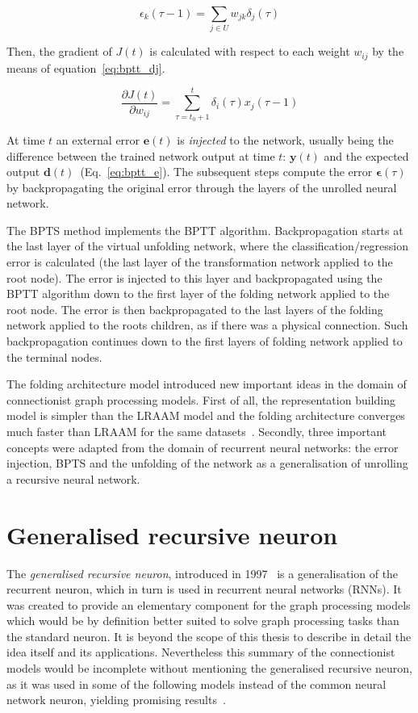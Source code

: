 \begin{equation}
\epsilon_k(\tau - 1) = \sum_{j \in U} w_{jk} \delta_j(\tau)
\label{eq:bptt_summaric}
\end{equation}

\noindent Then, the gradient of $J(t)$ is calculated with respect to each weight $w_{ij}$ by the means of equation~\ref{eq:bptt_dj}.

\begin{equation}
\frac{\partial J(t)}{\partial w_{ij}} = \sum_{\tau = t_0 + 1}^{t} \delta_i(\tau) x_j(\tau - 1)
\label{eq:bptt_dj}
\end{equation}

\noindent At time $t$ an external error $\bm{e}(t)$ is \emph{injected} to the network, usually being the difference between the trained network output at time $t$: $\bm{y}(t)$ and the expected output $\bm{d}(t)$~(Eq.~\ref{eq:bptt_e}). The subsequent steps compute the error $\bm{\epsilon}(\tau)$ by backpropagating the original error through the layers of the unrolled neural network.

The BPTS method implements the BPTT algorithm. Backpropagation starts at the last layer of the virtual unfolding network, where the classification/regression error is calculated (the last layer of the transformation network applied to the root node). The error is injected to this layer and backpropagated using the BPTT algorithm down to the first layer of the folding network applied to the root node. The error is then backpropagated to the last layers of the folding network applied to the roots children, as if there was a physical connection. Such backpropagation continues down to the first layers of folding network applied to the terminal nodes.

The folding architecture model introduced new important ideas in the domain of connectionist graph processing models. First of all, the representation building model is simpler than the LRAAM model and the folding architecture converges much faster than LRAAM for the same datasets~\cite{goller1996learning}. Secondly, three important concepts were adapted from the domain of recurrent neural networks: the error injection, BPTS and the unfolding of the network as a generalisation of unrolling a recursive neural network.

\section{Generalised recursive neuron}
The \emph{generalised recursive neuron}, introduced in 1997~\cite{sperduti1997supervised} is a generalisation of the recurrent neuron, which in turn is used in recurrent neural networks (RNNs). It was created to provide an elementary component for the graph processing models which would be by definition better suited to solve graph processing tasks than the standard neuron. It is beyond the scope of this thesis to describe in detail the idea itself and its applications. Nevertheless this summary of the connectionist models would be incomplete without mentioning the generalised recursive neuron, as it was used in some of the following models instead of the common neural network neuron, yielding promising results~\cite{frasconi1998general}.

